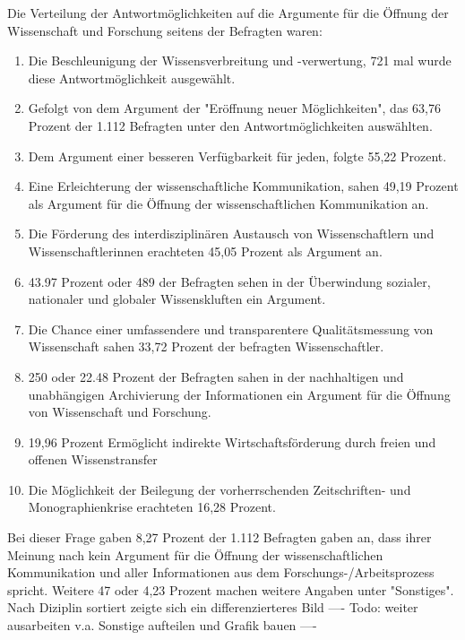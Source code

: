Die Verteilung der Antwortmöglichkeiten auf die Argumente für die Öffnung der Wissenschaft und Forschung seitens der Befragten waren:
\begin{enumerate}
\item Die Beschleunigung der Wissensverbreitung und -verwertung, 721 mal wurde diese Antwortmöglichkeit ausgewählt.
\item Gefolgt von dem Argument der "Eröffnung neuer Möglichkeiten", das 63,76 Prozent der 1.112 Befragten unter den Antwortmöglichkeiten auswählten.
\item Dem Argument einer besseren Verfügbarkeit für jeden, folgte 55,22 Prozent.
\item Eine Erleichterung der wissenschaftliche Kommunikation, sahen 49,19 Prozent als Argument für die Öffnung der wissenschaftlichen Kommunikation an.
\item Die Förderung des interdisziplinären Austausch von Wissenschaftlern und Wissenschaftlerinnen erachteten 45,05 Prozent als Argument an. 
\item 43.97 Prozent oder 489 der Befragten sehen in der Überwindung sozialer, nationaler und globaler Wissenskluften ein Argument.
\item Die Chance einer umfassendere und transparentere Qualitätsmessung von Wissenschaft sahen 33,72 Prozent der befragten Wissenschaftler.
\item 250 oder 22.48 Prozent der Befragten sahen in der nachhaltigen und unabhängigen Archivierung der Informationen ein Argument für die Öffnung von Wissenschaft und Forschung.
\item 19,96 Prozent Ermöglicht indirekte Wirtschaftsförderung durch freien und offenen Wissenstransfer
\item Die Möglichkeit der Beilegung der vorherrschenden Zeitschriften- und Monographienkrise erachteten 16,28 Prozent.
\end{enumerate}

Bei dieser Frage gaben 8,27 Prozent der 1.112 Befragten gaben an, dass ihrer Meinung nach kein Argument für die Öffnung der wissenschaftlichen Kommunikation und aller Informationen aus dem Forschungs-/Arbeitsprozess spricht. Weitere 47 oder 4,23 Prozent machen weitere Angaben unter "Sonstiges". Nach Diziplin sortiert zeigte sich ein differenzierteres Bild  ---- Todo: weiter ausarbeiten v.a. Sonstige aufteilen und Grafik bauen ----

